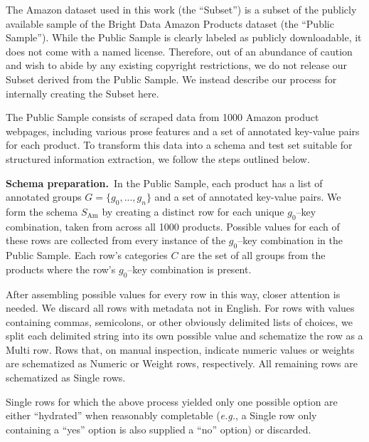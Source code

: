 The Amazon dataset used in this work (the ``Subset'') is a subset of the publicly available sample of the Bright Data Amazon Products dataset \cite{brightdata2025} (the ``Public Sample''). While the Public Sample is clearly labeled as publicly downloadable, it does not come with a named license. Therefore, out of an abundance of caution and wish to abide by any existing copyright restrictions, we do not release our Subset derived from the Public Sample. We instead describe our process for internally creating the Subset here.


The Public Sample consists of scraped data from 1000 Amazon product webpages, including various prose features and a set of annotated key-value pairs for each product. To transform this data into a schema and test set suitable for structured information extraction, we follow the steps outlined below.

\textbf{Schema preparation.}~In the Public Sample, each product has a list of annotated groups $G = \{g_0, ..., g_n\}$ and a set of annotated key-value pairs. We form the schema $S_{\mathrm{Am}}$ by creating a distinct row for each unique $g_0$--key combination, taken from across all 1000 products. Possible values for each of these rows are collected from every instance of the $g_0$--key combination in the Public Sample. Each row's categories $C$ are the set of all groups from the products where the row's $g_0$--key combination is present.

After assembling possible values for every row in this way, closer attention is needed. We discard all rows with metadata not in English. For rows with values containing commas, semicolons, or other obviously delimited lists of choices, we split each delimited string into its own possible value and schematize the row as a Multi row. Rows that, on manual inspection, indicate numeric values or weights are schematized as Numeric or Weight rows, respectively. All remaining rows are schematized as Single rows.

Single rows for which the above process yielded only one possible option are either ``hydrated'' when reasonably completable (\textit{e.g.}, a Single row only containing a ``yes'' option is also supplied a ``no'' option) or discarded.

